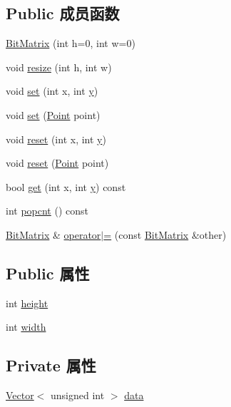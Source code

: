 \subsection*{Public 成员函数}
\begin{DoxyCompactItemize}
\item 
\hyperlink{classBitMatrix_ab15c012d5aa86228f2cf19e758fed178}{Bit\+Matrix} (int h=0, int w=0)
\item 
void \hyperlink{classBitMatrix_ab09face4935598cf90705d6e8f8d1cfa}{resize} (int h, int w)
\item 
void \hyperlink{classBitMatrix_ad26dd2e93e9d24d70834d6d79e29c81e}{set} (int x, int \hyperlink{classes_8txt_a52673b1e0cce0104e52dcd12727f211e}{y})
\item 
void \hyperlink{classBitMatrix_a8ac0c3b78a28101d75a26f3d7ad43d24}{set} (\hyperlink{classPoint}{Point} point)
\item 
void \hyperlink{classBitMatrix_a0ee870454e6343c3272ab791e45af404}{reset} (int x, int \hyperlink{classes_8txt_a52673b1e0cce0104e52dcd12727f211e}{y})
\item 
void \hyperlink{classBitMatrix_acfcf5e573a47dd45c47040d96774faa0}{reset} (\hyperlink{classPoint}{Point} point)
\item 
bool \hyperlink{classBitMatrix_ad19d1045b54ccc8a99d70d38305b4ca6}{get} (int x, int \hyperlink{classes_8txt_a52673b1e0cce0104e52dcd12727f211e}{y}) const 
\item 
int \hyperlink{classBitMatrix_aff2c100f5123e0f821a1d6c6d20daf21}{popcnt} () const 
\item 
\hyperlink{classBitMatrix}{Bit\+Matrix} \& \hyperlink{classBitMatrix_ae5aeab0b906b1e70fdc2086bb434dd85}{operator$\vert$=} (const \hyperlink{classBitMatrix}{Bit\+Matrix} \&other)
\end{DoxyCompactItemize}
\subsection*{Public 属性}
\begin{DoxyCompactItemize}
\item 
int \hyperlink{classBitMatrix_a3b7a1be96313cacfd3b2a08661dd919c}{height}
\item 
int \hyperlink{classBitMatrix_ac271de23ac5446a0a75ee457a385d882}{width}
\end{DoxyCompactItemize}
\subsection*{Private 属性}
\begin{DoxyCompactItemize}
\item 
\hyperlink{classVector}{Vector}$<$ unsigned int $>$ \hyperlink{classBitMatrix_a8a914444d9945c79a7e3cc88a49ef928}{data}
\end{DoxyCompactItemize}
